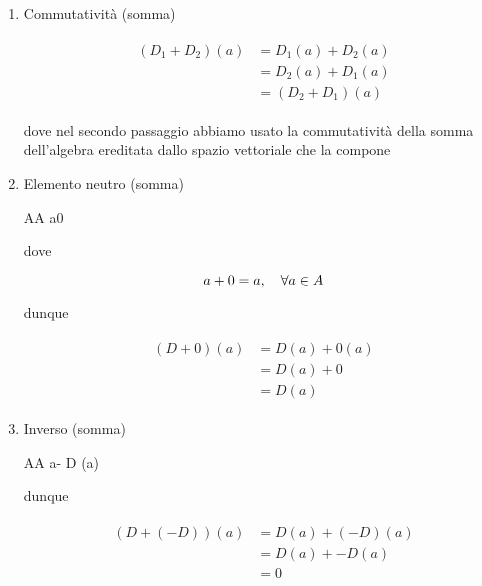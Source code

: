 {\begin{enumerate}
	\begin{align}
		\begin{split}
			( D_{1} + (D_{2} + D_{3}) ) (a) &= D_{1} (a) + (D_{2} + D_{3}) (a) \\
			&= D_{1} (a) + D_{2} (a) + D_{3} (a) \\
			&= (D_{1} + D_{2}) (a) + D_{3} (a) \\
			&= ( (D_{1} + D_{2}) + D_{3} ) (a)
		\end{split}
	\end{align}
	
	\item Commutatività (somma)
	
	\begin{align}
		\begin{split}
			(D_{1} + D_{2}) (a) &= D_{1} (a) + D_{2} (a) \\
			&= D_{2} (a) + D_{1} (a) \\
			&= (D_{2} + D_{1}) (a)
		\end{split}
	\end{align}
	
	dove nel secondo passaggio abbiamo usato la commutatività della somma dell'algebra ereditata dallo spazio vettoriale che la compone
	
	\item Elemento neutro (somma)
	
		{A}{A}
		{a}{0}
	
	dove
	
	\begin{equation}
		a + 0 = a \qcomma \forall a \in A
	\end{equation}
	
	dunque
	
	\begin{align}
		\begin{split}
			(D + 0) (a) &= D (a) + 0 (a) \\
			&= D (a) + 0 \\
			&= D (a)
		\end{split}
	\end{align}
	
	\item Inverso (somma)
	
		{A}{A}
		{a}{- D (a)}
	
	dunque
	
	\begin{align}
		\begin{split}
			(D + (- D)) (a) &= D (a) + (- D) (a) \\
			&= D (a) + - D (a) \\
			&= 0
		\end{split}
	\end{align}
	

\end{enumerate}}
